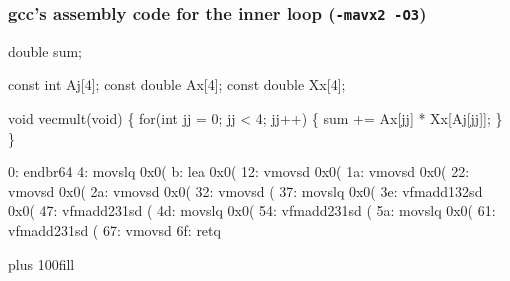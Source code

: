 \documentclass{beamer}
\begin{document}
\begin{frame}[fragile]
\frametitle{gcc's assembly code for the inner loop ({\tt -mavx2 -O3})}
\begin{semiverbatim}
\tiny
double sum;

const int Aj[4];
const double Ax[4];
const double Xx[4];

void vecmult(void)
\{
    for(int jj = 0; jj < 4; jj++) \{
        sum += Ax[jj] * Xx[Aj[jj]];
    \}
\}

0:   endbr64
4:   movslq       0x0(%
b:   lea          0x0(%
12:  vmovsd       0x0(%
1a:  vmovsd       0x0(%
22:  vmovsd       0x0(%
2a:  vmovsd       0x0(%
32:  vmovsd       (%
37:  movslq       0x0(%
3e:  vfmadd132sd  0x0(%
47:  vfmadd231sd  (%
4d:  movslq       0x0(%
54:  vfmadd231sd  (%
5a:  movslq       0x0(%
61:  vfmadd231sd  (%
67:  vmovsd       %
6f:  retq

\end{semiverbatim}
\vskip 0pt plus 100fill
\end{frame}
\end{document}
